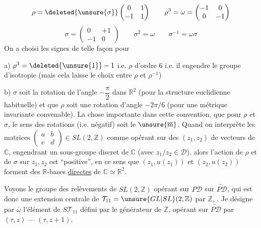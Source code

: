 \[
\rho=\deleted{\unsure{\sigma}}\begin{pmatrix}0&1\\-1&1\end{pmatrix}\qquad\rho^3=\omega=\begin{pmatrix}-1&0\\0&-1\end{pmatrix}
\]
\[
\sigma=\begin{pmatrix}0&+1\\-1&0\end{pmatrix}\qquad\sigma^2=\omega\qquad\sigma^{-1}=\omega\sigma
\]
On a choisi les signes de telle façon pour

a) $\rho^3=\deleted{\unsure{1}}-1$ i.e. $\rho$ d'ordre $6$ i.e. il engendre le groupe d'isotropie  (mais cela laisse le choix entre $\rho$ et $\rho^{-1}$)

b) $\sigma$ soit la rotation de l'angle $-\dfrac\pi2$ dans $\mathbb R^2$ (pour la structure euclidienne habituelle) et que $\rho$ soit une rotation d'angle $-2\pi/6$ (pour une métrique invariante convenable).
La chose importante dans cette convention,  que pour $\rho$ et $\sigma$, le sens des rotations (i.e. négatif) soit le $\unsure{\overline{\mathrm m}}$.
Quand on interprète  les matrices $\begin{pmatrix}a&b\\c&d\end{pmatrix}\in SL(2,\mathbb Z)$ comme opérant sur des  $(z_1,z_2)$ de vecteurs de $\mathbb C$, engendrant un sous-groupe discret de $\mathbb C$ (avec $z_1/z_2\in\mathcal D$), alors l'action de $\rho$ et de $\sigma$ sur $z_1,z_2$ est ``positive'', en ce sens que $(z_1,u(z_1))$ et $(z_2,u(z_2))$ forment des $\mathbb R$-bases \uline{directes} de $\mathbb C\simeq\mathbb R^2$.

Voyons le groupe des relèvements de $SL(2,\mathbb Z)$ opérant sur $P\mathcal D$ sur $\widetilde{P\mathcal D}$, qui est donc une extension centrale de $\mathcal T_{11}=\unsure{GL|SL}(2,\mathbb Z)$ par $\mathbb Z$, .
Je désigne par \deleted{$\unsure{\omega}$} $\overline\omega$ l'élément de  $S\mathcal T_{11}$ défini par le générateur de $\mathbb Z$, opérant sur $\widetilde{P\mathcal D}$ par $(\tau,z)\mathrel{\text{---}}(\tau,z+1)$.
